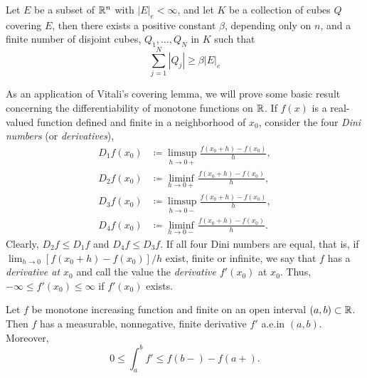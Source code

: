 \begin{theorem}
Let $E$ be a subset of $\mathbb{R}^n$ with $|E|_e<\infty$, and let $K$ be a
collection of cubes $Q$ covering $E$, then there exists a positive constant
$\beta$, depending only on $n$, and a finite number of disjoint cubes,
$Q_1,\dotsc,Q_N$ in $K$ such that
\[
\sum_{j=1}^N|Q_j|\geq\beta|E|_e
\]
\end{theorem}

As an application of Vitali's covering lemma, we will prove some basic
result concerning the differentiability of monotone functions on $\mathbb{R}$. If
$f(x)$ is a real-valued function defined and finite in a neighborhood of
$x_0$, consider the four \emph{Dini numbers} (or \emph{derivatives}),
\[
\begin{aligned}
D_1f(x_0)&\coloneqq\limsup_{h\to 0+}\frac{f(x_0+h)-f(x_0)}{h},\\
D_2f(x_0)&\coloneqq\liminf_{h\to 0+}\frac{f(x_0+h)-f(x_0)}{h},\\
D_3f(x_0)&\coloneqq\limsup_{h\to 0-}\frac{f(x_0+h)-f(x_0)}{h},\\
D_4f(x_0)&\coloneqq\liminf_{h\to 0-}\frac{f(x_0+h)-f(x_0)}{h}.
\end{aligned}
\]
Clearly, $D_2f\leq D_1f$ and $D_4f\leq D_3f$. If all four Dini numbers are
equal, that is, if $\lim_{h\to 0}[f(x_0+h)-f(x_0)]/h$ exist, finite or
infinite, we say that $f$ has a \emph{derivative at $x_0$} and call the
value the \emph{derivative $f'(x_0)$} at $x_0$. Thus, $-\infty\leq
f'(x_0)\leq\infty$ if $f'(x_0)$ exists.
\begin{theorem}[7.21]
Let $f$ be monotone increasing function and finite on an open interval
$(a,b)\subset\mathbb{R}$. Then $f$ has a measurable, nonnegative, finite
derivative $f'$ a.e.\@ in $(a,b)$. Moreover,
\[
0\leq\int_a^b f'\leq f(b-)-f(a+).
\]
\end{theorem}

